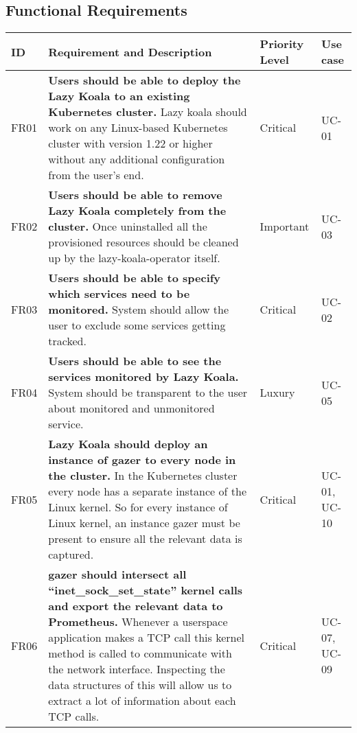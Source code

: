 
\newcommand{\functionalRequirement}[5]{
    #1 &
    \textbf{#2} \newline #3 &
    #4 &
    #5  \\ \hline
}

\subsection{Functional Requirements}

\begin{longtable}{|p{9mm}|p{107mm}|p{16mm}|p{13mm}|}
\hline
    \textbf{ID} &
    \textbf{Requirement and Description} &
    \textbf{Priority Level} &
    \textbf{Use case} \\ \hline


    \functionalRequirement
    {FR01}
    {Users should be able to deploy the Lazy Koala to an existing Kubernetes cluster.}
    {Lazy koala should work on any Linux-based Kubernetes cluster with version 1.22 or higher without any additional configuration from the user's end.}
    {Critical}
    {UC-01}
    
    \functionalRequirement
    {FR02}
    {Users should be able to remove Lazy Koala completely from the cluster.}
    {Once uninstalled all the provisioned resources should be cleaned up by the \ac{lazy-koala-operator} itself. }
    {Important}
    {UC-03}
    
        
    \functionalRequirement
    {FR03}
    {Users should be able to specify which services need to be monitored.}
    {System should allow the user to exclude some services getting tracked.}
    {Critical}
    {UC-02}
    
        
    \functionalRequirement
    {FR04}
    {Users should be able to see the services monitored by Lazy Koala.}
    {System should be transparent to the user about monitored and unmonitored service.}
    {Luxury}
    {UC-05}
    
        
    \functionalRequirement
    {FR05}
    {Lazy Koala should deploy an instance of \ac{gazer} to every node in the cluster.}
    {In the Kubernetes cluster every node has a separate instance of the Linux kernel. So for every instance of Linux kernel, an instance \ac{gazer} must be present to ensure all the relevant data is captured.}
    {Critical}
    {UC-01, UC-10}
    
        
    \functionalRequirement
    {FR06}
    {\ac{gazer} should intersect all “inet\_sock\_set\_state” kernel calls and export the relevant data to Prometheus.}
    {Whenever a userspace application makes a TCP call this kernel method is called to communicate with the network interface. Inspecting the data structures of this will allow us to extract a lot of information about each TCP calls.}
    {Critical}
    {UC-07, UC-09}
    

\end{longtable}
